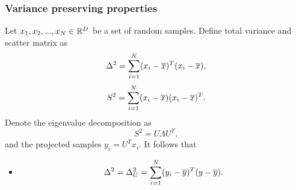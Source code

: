 \begin{refsection}
\subsubsection{Variance preserving properties}

\begin{lemma}\label{ch:statistical-learning:th:PCAVariancePreservingProperty}
Let $x_1,x_2,...,x_N \in \mathbb{R}^{D}$ be a set of random samples.
Define total variance and scatter matrix as
$$\Delta^2 = \sum_{i=1}^N (x_i - \overline{x})^T(x_i - \overline{x}),$$	
$$S^2 = \sum_{i=1}^N (x_i - \overline{x})(x_i - \overline{x})^T.$$
Denote the eigenvalue decomposition as
$$S^2 = U\Lambda U^T,$$
and the projected samples $y_i = U^Tx_i$. 
It follows that 
\begin{itemize}
	\item $$\Delta^2 = \Delta^2_U = \sum_{i=1}^N (y_i - \overline{y})^T(y - \overline{y}).$$
	

\end{itemize}
\end{lemma}
\end{refsection}
